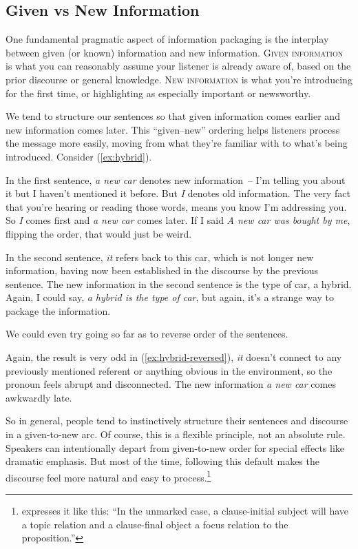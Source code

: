 \subsection{Given vs New Information}

One fundamental pragmatic aspect of information packaging is the interplay between given (or known) information and new information. \textsc{Given information} is what you can reasonably assume your listener is already aware of, based on the prior discourse or general knowledge. \textsc{New information} is what you're introducing for the first time, or highlighting as especially important or newsworthy.

We tend to structure our sentences so that given information comes earlier and new information comes later. This ``given--new'' ordering helps listeners process the message more easily, moving from what they're familiar with to what's being introduced. Consider (\ref{ex:hybrid}).

\label{ex:hybrid}
\z

In the first sentence, \textit{a new car} denotes new information~-- I'm telling you about it but I haven't mentioned it before. But \textit{I} denotes old information. The very fact that you're hearing or reading those words, means you know I'm addressing you. So \textit{I} comes first and \textit{a new car} comes later. If I said \textit{A new car was bought by me}, flipping the order, that would just be weird.

In the second sentence, \textit{it} refers back to this car, which is not longer new information, having now been established in the discourse by the previous sentence. The new information in the second sentence is the type of car, a hybrid. Again, I could say, \textit{a hybrid is the type of car}, but again, it's a strange way to package the information.

We could even try going so far as to reverse order of the sentences.

\label{ex:hybrid-reversed}
\z

Again, the result is very odd in (\ref{ex:hybrid-reversed}), \textit{it} doesn't connect to any previously mentioned referent or anything obvious in the environment, so the pronoun feels abrupt and disconnected. The new information \textit{a new car} comes awkwardly late.

So in general, people tend to instinctively structure their sentences and discourse in a given-to-new arc. Of course, this is a flexible principle, not an absolute rule. Speakers can intentionally depart from given-to-new order for special effects like dramatic emphasis. But most of the time, following this default makes the discourse feel more natural and easy to process.\footnote{\citet[16]{Lambrecht1994} expresses it like this: ``In the unmarked case, a clause-initial subject will have a topic relation and a clause-final object a focus relation to the proposition.''}


